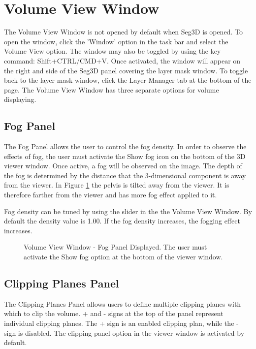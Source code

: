 \documentclass[fleqn,11pt,openany]{book}
\begin{document}
\section{Volume View Window}
The Volume View Window is not opened by default when Seg3D is opened.  
To open the window, click the 'Window' option in the task bar and select the Volume View option.  
The window may also be toggled by using the key command: Shift+CTRL/CMD+V. 
Once activated, the window will appear on the right and side of the Seg3D panel covering the layer mask window.
To toggle back to the layer mask window, click the Layer Manager tab at the bottom of the page.
The Volume View Window has three separate options for volume displaying.



\subsection{Fog Panel}
\label{sec:fog}


The Fog Panel allows the user to control the fog density.  
In order to observe the effects of fog, the user must activate the Show fog icon on the bottom of the 3D viewer window.
Once active, a fog will be observed on the image.  
The depth of the fog is determined by the distance that the 3-dimensional component is away from the viewer.   
In Figure \ref{fig:FogPanel} the pelvis is tilted away from the viewer.
It is therefore farther from the viewer and has more fog effect applied to it.

Fog density can be tuned by using the slider in the the Volume View Window.  
By default the density value is 1.00.
If the fog density increases, the fogging effect increases.
\begin{figure}[t]
\caption{Volume View Window - Fog Panel Displayed. The user must activate the Show fog option at the bottom of the viewer window.}\label{fig:FogPanel}
\end{figure}

\subsection{Clipping Planes Panel}
\label{sec:clipping}
The Clipping Planes Panel allows users to define multiple clipping planes with which to clip the volume.  
+ and - signs at the top of the panel represent individual clipping planes.  
The + sign is an enabled clipping plan, while the - sign is disabled.
The clipping panel option in the viewer window is activated by default.
\end{document}
